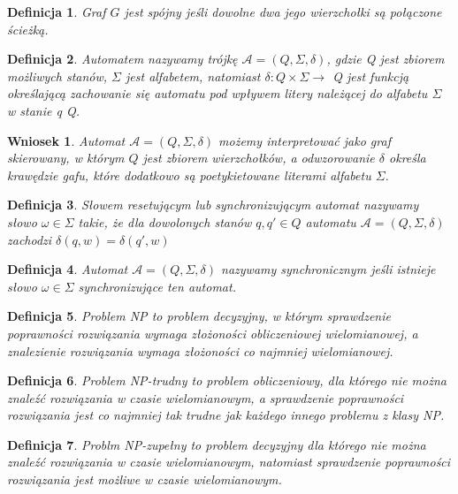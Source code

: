 \documentclass[12pt,a4paper]{article}
\newtheorem{df}{Definicja}[section]
\newtheorem{wn}{Wniosek}[section]
\begin{document}
\begin{df} 
Graf $G$ jest sp\'ojny je\'sli dowolne dwa jego wierzcho{\l}ki s\k{a} po{\l}\k{a}czone \'scie\.zk\k{a}.
\end{df}
\begin{df} 
Automatem nazywamy tr\'{o}jk\k{e} $\mathscr{A}=(Q, \Sigma, \delta)$, gdzie Q jest zbiorem mo\.{z}liwych stan\'{o}w, $\Sigma$ jest alfabetem, natomiast $\delta:Q \times \Sigma \rightarrow$ Q jest funkcj\k{a} okre\'{s}laj\k{a}c\k{a} zachowanie si\k{e} automatu pod wp{\l}ywem litery nale\.{z}\k{a}cej do alfabetu $\Sigma$ w stanie q \in Q.
\end{df}
\begin{wn}
Automat $\mathscr{A}=(Q, \Sigma, \delta)$ mo\.zemy interpretowa\'c jako graf skierowany, w kt\'orym $Q$ jest zbiorem wierzcho{\l}k\'ow, a odwzorowanie $\delta$ okre\'sla kraw\k{e}dzie gafu, kt\'ore dodatkowo s\k{a} poetykietowane literami alfabetu $\Sigma$.
\end{wn}
\begin{df} 
S{\l}owem resetuj\k{a}cym lub synchronizuj\k{a}cym automat nazywamy s{\l}owo $\omega \in \Sigma$ takie, \.{z}e dla dowolonych stan\'{o}w $q, q' \in Q$ automatu $\mathscr{A}=(Q, \Sigma, \delta)$ zachodzi $\delta(q,w)=\delta(q',w)$
\end{df}
\begin{df} 
Automat $\mathscr{A}=(Q, \Sigma, \delta)$ nazywamy synchronicznym je\'{s}li istnieje s{\l}owo $\omega \in \Sigma$ synchronizuj\k{a}ce ten automat.
\end{df}
\begin{df}
Problem NP to problem decyzyjny, w kt\'orym sprawdzenie poprawno\'sci rozwi\k{a}zania wymaga z{\l}o\.zono\'sci obliczeniowej wielomianowej, a znalezienie rozwi\k{a}zania wymaga z{\l}o\.zono\'sci co najmniej wielomianowej.
\end{df}
\begin{df}
Problem NP-trudny to problem obliczeniowy, dla kt\'orego nie mo\.zna znale\'z\'c rozwi\k{a}zania w czasie wielomianowym, a sprawdzenie poprawno\'sci rozwi\k{a}zania jest co najmniej tak trudne jak ka\.zdego innego problemu z klasy NP.
\end{df}
\begin{df}
Problm NP-zupe{\l}ny to problem decyzyjny dla kt\'orego nie mo\.zna znale\'z\'c rozwi\k{a}zania w czasie wielomianowym, natomiast sprawdzenie poprawno\'sci rozwi\k{a}zania jest mo\.zliwe w czasie wielomianowym. 
\end{df}
\end{document}
